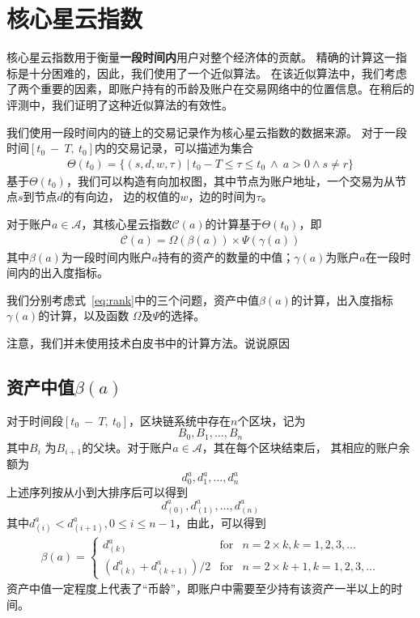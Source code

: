 \section{核心星云指数}

核心星云指数用于衡量{\textbf{一段时间内}}用户对整个经济体的贡献。
精确的计算这一指标是十分困难的，因此，我们使用了一个近似算法。
在该近似算法中，我们考虑了两个重要的因素，即账户持有的币龄及账户在交易网络中的位置信息。在稍后的评测中，我们证明了这种近似算法的有效性。


我们使用一段时间内的链上的交易记录作为核心星云指数的数据来源。
对于一段时间$[t_0\ −\ T,\ t_0]$内的交易记录，可以描述为集合
\begin{align}
\Theta(t_0) = \{(s, d, w, \tau)\ |\ t_0 - T \le \tau \le t_0\ \land \ a > 0 \land s \neq r \}
\end{align}
\noindent 基于$\Theta(t_0)$，我们可以构造有向加权图，其中节点为账户地址，一个交易为从节点$s$到节点$d$的有向边，
边的权值的$w$，边的时间为$\tau$。


对于账户$a \in \mathcal{A}$，其核心星云指数$\mathcal{C}(a)$的计算基于$\Theta(t_0)$，即
\begin{align}
\mathcal{C}(a) = \Omega(\beta(a)) \times{} \Psi(\gamma(a))
\label{eq:rank}
\end{align}
\noindent 其中$\beta(a)$为一段时间内账户$a$持有的资产的数量的中值；$\gamma(a)$为账户$a$在一段时间内的出入度指标。

我们分别考虑式~\ref{eq:rank}中的三个问题，资产中值$\beta(a)$的计算，出入度指标$\gamma(a)$的计算，以及函数
$\Omega$及$\Psi$的选择。

{\color{gray}注意，我们并未使用技术白皮书中的计算方法。说说原因}
\subsection*{资产中值$\beta(a)$}
对于时间段$[t_0\ −\ T,\ t_0]$，区块链系统中存在$n$个区块，记为
\[
B_0, B_1, \dots, B_n
\]
\noindent 其中$B_{i}$ 为$B_{i+1}$的父块。对于账户$a \in \mathcal{A}$，其在每个区块结束后，
其相应的账户余额为
\[
d^a_0, d^a_1, \dots, d^a_n
\]
上述序列按从小到大排序后可以得到
\[
d^a_{(0)}, d^a_{(1)}, \dots, d^a_{(n)}
\]
其中$d^a_{(i)} < d^a_{(i+1)}, 0\le i \le {n-1}$，由此，可以得到
\begin{align}
\beta(a) = \left\{ \begin{array}{rcl}
{d^a_{(k)}} & \mbox{for} & n=2\times{}k, k=1, 2, 3, \ldots \\
{(d^a_{(k)} + d^a_{(k+1)})/2} & \mbox{for} & n=2\times{}k + 1, k=1, 2, 3, \ldots
\end{array}\right.
\end{align}
资产中值一定程度上代表了“币龄”，即账户中需要至少持有该资产一半以上的时间。

